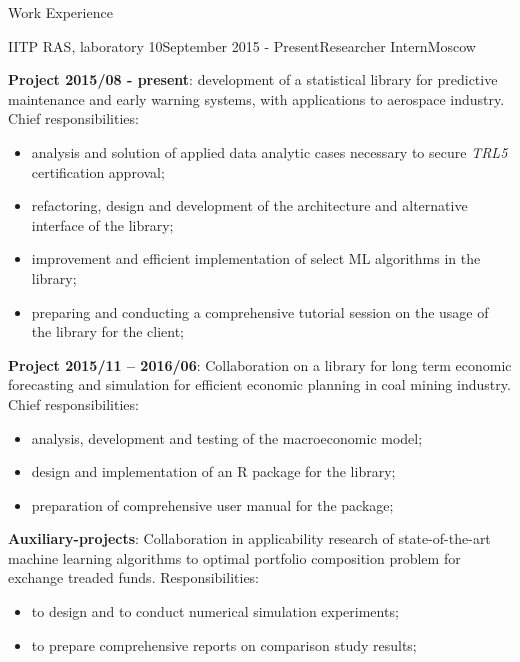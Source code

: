 \documentclass{resume} %
\begin{document}
\begin{rSection}{Work Experience}
\begin{rSubsection}{IITP RAS, laboratory 10}{September 2015 - Present}{Researcher Intern}{Moscow}
    \item \textbf{Project 2015/08 - present}: development of a statistical library
    for predictive maintenance and early warning systems, with applications to
    aerospace industry. Chief responsibilities: \begin{itemize}
        \item analysis and solution of applied data analytic cases necessary to
        secure \textit{TRL5} certification approval;
        \item refactoring, design and development of the architecture and alternative
        interface of the library;
        \item improvement and efficient implementation of select ML algorithms in
        the library;
        \item preparing and conducting a comprehensive tutorial session on the usage
        of the library for the client;
    \end{itemize} \medskip
    \item \textbf{Project 2015/11 -- 2016/06}: Collaboration on a library for long
    term economic forecasting and simulation for efficient economic planning in coal
    mining industry. Chief responsibilities: \begin{itemize}
        \item analysis, development and testing of the macroeconomic model;
        \item design and implementation of an R package for the library;
        \item preparation of comprehensive user manual for the package;
    \end{itemize} \medskip
    \item \textbf{Auxiliary-projects}: Collaboration in applicability research of
    state-of-the-art machine learning algorithms to optimal portfolio composition
    problem for exchange treaded funds. Responsibilities: \begin{itemize}
        \item to design and to conduct numerical simulation experiments;
        \item to prepare comprehensive reports on comparison study results;

\end{itemize}
\end{rSubsection}
\end{rSection}
\end{document}
